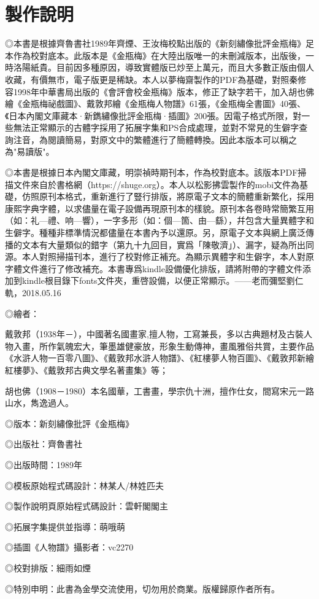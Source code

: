 \chapter*{製作說明}


◎本書是根據齊魯書社1989年齊煙、王汝梅校點出版的《新刻繡像批評金瓶梅》足本作為校對底本。此版本是《金瓶梅》在大陸出版唯一的未刪減版本，出版後，一時洛陽紙貴。目前因多種原因，導致實體版已炒至上萬元，而且大多數正版由個人收藏，有價無市，電子版更是稀缺。本人以夢梅齋製作的PDF為基礎，對照秦修容1998年中華書局出版的《會評會校金瓶梅》版本，修正了缺字若干，加入胡也佛繪《金瓶梅祕戲圖》、戴敦邦繪《金瓶梅人物譜》61張，《金瓶梅全書圖》40張、《日本內閣文庫藏本·新鐫繡像批評金瓶梅·插圖》200張。因電子格式所限，對一些無法正常顯示的古體字採用了拓展字集和PS合成處理，並對不常見的生僻字查詢注音，為閱讀簡易，對原文中的繁體進行了簡體轉換。因此本版本可以稱之為"易讀版"。

   ◎本書是根據日本內閣文庫藏，明崇禎時期刊本，作為校對底本。該版本PDF掃描文件來自於書格網（https://shuge.org）。本人以松影拂雲製作的mobi文件為基礎，仿照原刊本格式，重新進行了豎行排版，將原電子文本的簡體重新繁化，採用康熙字典字體，以求儘量在電子設備再現原刊本的樣貌。原刊本各卷時常簡繁互用（如：礼—禮、响—響），一字多形（如：個—箇、由—繇），幷包含大量異體字和生僻字。種種非標準情況都儘量在本書內予以還原。另，原電子文本與網上廣泛傳播的文本有大量類似的錯字（第九十九回目，實爲「陳敬濟」）、漏字，疑為所出同源。本人對照掃描刊本，進行了校對修正補充。為顯示異體字和生僻字，本人對原字體文件進行了修改補充。本書專爲kindle設備優化排版，請將附帶的字體文件添加到kindle根目錄下fonts文件夾，重啓設備，以便正常顯示。——老而彌堅劉仁軌，2018.05.16 

◎繪者：

戴敦邦（1938年－），中國著名國畫家,擅人物，工寫兼長，多以古典題材及古裝人物入畫，所作氣魄宏大，筆墨雄健豪放，形象生動傳神，畫風雅俗共賞，主要作品《水滸人物一百零八圖》、《戴敦邦水滸人物譜》、《紅樓夢人物百圖》、《戴敦邦新繪紅樓夢》、《戴敦邦古典文學名著畫集》等；

胡也佛（1908－1980）本名國華，工書畫，學宗仇十洲，擅作仕女，間寫宋元一路山水，雋逸過人。

◎版本：新刻繡像批評《金瓶梅》

◎出版社：齊魯書社

◎出版時間：1989年

◎模板原始程式碼設計：林某人/林姓匹夫

◎製作說明頁原始程式碼設計：雲軒閣閣主

◎拓展字集提供並指導：萌哦萌

◎插圖《人物譜》攝影者：vc2270

◎校對排版：細雨如煙

◎特別申明：此書為金學交流使用，切勿用於商業。版權歸原作者所有。

